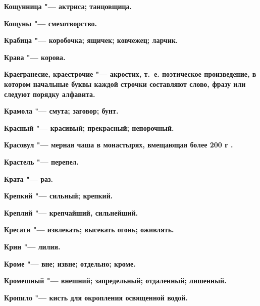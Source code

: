 \begin{mymulticols}{2}
\bfseries Кощунница\normalfont{} "--- актриса; танцовщица. 




\bfseries Кощуны\normalfont{} "--- смехотворство. 




\bfseries Крабица\normalfont{} "--- коробочка; ящичек; ковчежец; ларчик. 




\bfseries Крава\normalfont{} "--- корова. 




\bfseries Краегранесие, краестрочие\normalfont{} "--- акростих, т.~е. поэтическое произведение, в котором начальные буквы каждой строчки составляют слово, фразу или следуют порядку алфавита. 




\bfseries Крамола\normalfont{} "--- смута; заговор; бунт. 




\bfseries Красный\normalfont{} "--- красивый; прекрасный; непорочный. 




\bfseries Красовул\normalfont{} "--- мерная чаша в монастырях, вмещающая более 200 г . 




\bfseries Крастель\normalfont{} "--- перепел. 




\bfseries Крата\normalfont{} "--- раз. 




\bfseries Крепкий\normalfont{} "--- сильный; крепкий. 




\bfseries Креплий\normalfont{} "--- крепчайший, сильнейший. 




\bfseries Кресати\normalfont{} "--- извлекать; высекать огонь; оживлять. 




\bfseries Крин\normalfont{} "--- лилия. 




\bfseries Кроме\normalfont{} "--- вне; извне; отдельно; кроме. 




\bfseries Кромешный\normalfont{} "--- внешний; запредельный; отдаленный; лишенный. 




\bfseries Кропило\normalfont{} "--- кисть для окропления освященной водой. 





\end{mymulticols}
